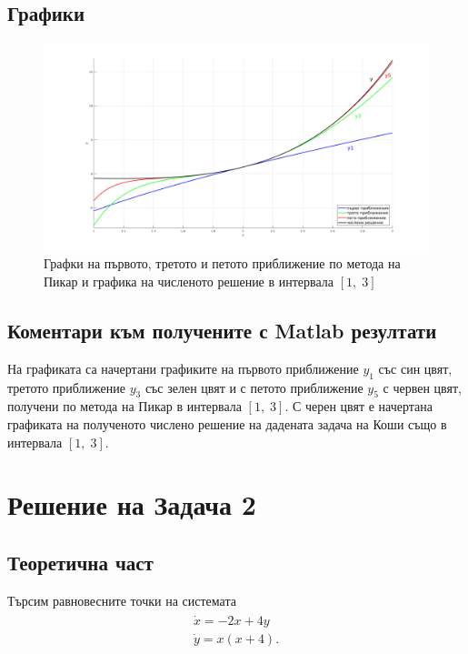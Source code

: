 \documentclass[a4paper, 12pt]{article}
\begin{document}
\subsection{Графики}

\begin{figure}[ht]
    \centering
    \includegraphics[width=\textwidth]{tema3_zad1.png}
    \caption{Графки на първото, третото и петото приближение по метода на Пикар и графика на численото решение в интервала $[1, \; 3]$}
\end{figure}

\subsection{Коментари към получените с Matlab резултати}

На графиката са начертани графиките на
първото приближение $y_1$ със син цвят,
третото приближение $y_3$ със зелен цвят
и с петото приближение $y_5$ с червен цвят,
получени по метода на Пикар в интервала $[1, \; 3]$.
С черен цвят е начертана графиката на полученото числено
решение на дадената задача на Коши също в интервала $[1, \; 3]$.

\section{Решение на Задача 2}

\subsection{Теоретична част}

Търсим равновесните точки на системата
\begin{align*} 
    \begin{array}{|l}
        \dot{x} = -2x + 4y \\
        \dot{y} = x(x + 4).    
    \end{array}
\end{align*}
\end{document}
